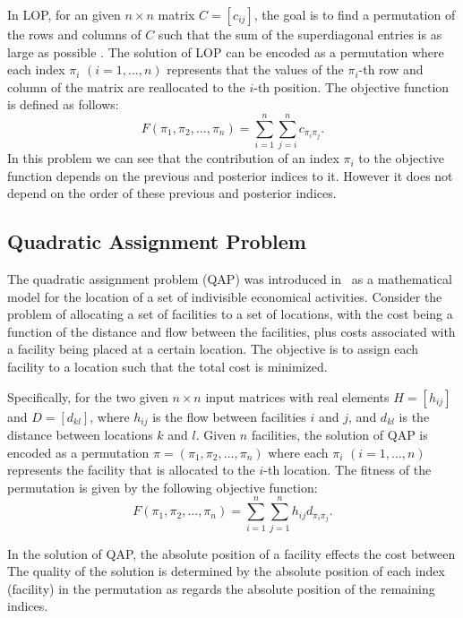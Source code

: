 In LOP, for an given $n\times n$ matrix $C=[c_{ij}]$, the goal is to find a permutation of the rows and columns of $C$ such that the sum of the superdiagonal entries is as large as possible . The solution of LOP can be encoded as a permutation where each index $\pi_i$ $(i=1,...,n)$ represents that the values of the $\pi_i$-th row and column of the matrix are reallocated to the $i$-th position. The objective function is defined as follows:
\begin{equation*}
	F(\pi_1, \pi_2, ... , \pi_n) = \sum^{n}_{i=1}\sum^{n}_{j=i}{ c_{\pi_i\pi_j} } \text{.}
\end{equation*}
In this problem we can see that the contribution of an index $\pi_i$ to the objective function depends on the previous and posterior indices to it. However it does not depend on the order of these previous and posterior indices.


\subsection{Quadratic Assignment Problem}
The quadratic assignment problem (QAP) was introduced in~\citep{koopmans1957assignment} as a mathematical model for the location of a set of indivisible economical activities. Consider the problem of allocating a set of facilities to a set of locations, with the cost being a function of the distance and flow between the facilities, plus costs associated with a facility being placed at a certain location. The objective is to assign each facility to a location such that the total cost is minimized.

Specifically, for the two given $n\times n$ input matrices with real elements $H=[h_{ij}]$ and $D=[d_{kl}]$, where $h_{ij}$ is the flow between facilities $i$ and $j$, and $d_{kl}$ is the distance between locations $k$ and $l$. Given $n$ facilities, the solution of QAP is encoded as a permutation $\pi = (\pi_1, \pi_2,...,\pi_n)$ where each $\pi_i$ $(i =1,...,n)$ represents the facility that is allocated to the $i$-th location. The fitness of the permutation is given by the following objective function:
\begin{equation*}
	F(\pi_1, \pi_2, ... , \pi_n) = \sum^{n}_{i=1}\sum^{n}_{j=1}{ h_{ij}d_{\pi_i\pi_j} } \text{.}
\end{equation*}

In the solution of QAP, the absolute position of a facility effects the cost between 
The quality of the solution is determined by the absolute position of each index (facility) in the permutation as regards the absolute position of the remaining indices.


